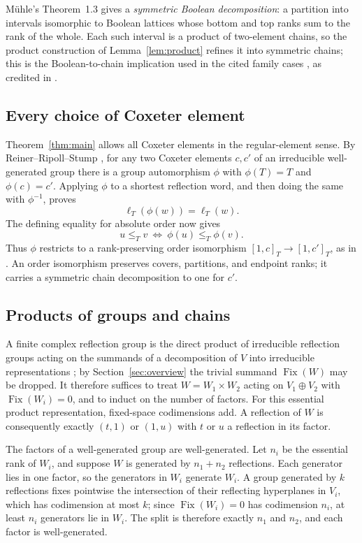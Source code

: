 \documentclass[11pt]{article}
\theoremstyle{definition}
\newcommand{\Fix}{\operatorname{Fix}}
\begin{document}
M\"uhle's Theorem~1.3 gives a \emph{symmetric Boolean decomposition}:
a partition into intervals isomorphic to Boolean lattices whose bottom
and top ranks sum to the rank of the whole. Each such interval is a
product of two-element chains, so the product construction of
Lemma~\ref{lem:product} refines it into symmetric chains; this is the
Boolean-to-chain implication used in the cited family cases
\cite[Observation~10]{Petersen}, as credited in
\cite[Proposition~2.1]{Muhle}.

\subsection{Every choice of Coxeter element}
Theorem~\ref{thm:main} allows all Coxeter elements in the regular-element
sense. By Reiner--Ripoll--Stump \cite[Proposition~1.4]{RRS},
for any two Coxeter elements $c,c'$ of an irreducible well-generated
group there is a group automorphism $\phi$ with
$\phi(T)=T$ and $\phi(c)=c'$. Applying $\phi$ to a shortest
reflection word, and then doing the same with $\phi^{-1}$, proves
\[
                       \ell_T(\phi(w))=\ell_T(w).
\]
The defining equality for absolute order now gives
\[
 u\leq_T v\ \Longleftrightarrow\ \phi(u)\leq_T\phi(v).
\]
Thus $\phi$ restricts to a rank-preserving order isomorphism
$[1,c]_T\to[1,c']_T$, as in \cite[Corollary~1.5]{RRS}.
An order isomorphism preserves covers,
partitions, and endpoint ranks; it carries a symmetric chain
decomposition to one for $c'$.

\subsection{Products of groups and chains}
A finite complex reflection group is the direct product of irreducible
reflection groups acting on the summands of a decomposition of $V$
into irreducible representations \cite[\S1, p.~817]{Bessis}; by
Section~\ref{sec:overview} the trivial summand $\Fix(W)$ may be
dropped. It therefore suffices to treat $W=W_1\times W_2$ acting on
$V_1\oplus V_2$ with $\Fix(W_i)=0$, and to induct on the number of
factors. For this essential product representation, fixed-space
codimensions add. A reflection of $W$ is consequently exactly $(t,1)$
or $(1,u)$ with $t$ or $u$ a reflection in its factor.

The factors of a well-generated group are well-generated. Let $n_i$
be the essential rank of $W_i$, and suppose $W$ is generated by
$n_1+n_2$ reflections. Each generator lies in one factor, so the
generators in $W_i$ generate $W_i$. A group generated by $k$
reflections fixes pointwise the intersection of their reflecting
hyperplanes in $V_i$, which has codimension at most $k$; since
$\Fix(W_i)=0$ has codimension $n_i$, at least $n_i$ generators lie in
$W_i$. The split is therefore exactly
$n_1$ and $n_2$, and each factor is well-generated.
\end{document}
